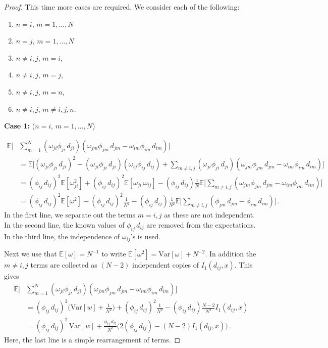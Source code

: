 \documentclass{article}
\newcommand{\EE}{\mathds{E}}
\newcommand{\var}{\text{Var}}
\begin{document}
\begin{proof}
    This time more cases are required. We consider each of the following:
    \begin{enumerate}
        \item $n=i$, $m=1,\dots,N$
        \item $n=j$, $m=1,\dots,N$
        \item $n\neq i,j$, $m=i$, 
        \item $n\neq i,j$, $m=j$, 
        \item $n\neq i,j$, $m=n$, 
        \item $n\neq i,j$, $m\neq i,j,n$. 
    \end{enumerate}
    
    \textbf{Case 1:} ($n=i$, $m=1,\dots,N$)
    
    \begin{align*}
        \EE\Bigg[&\sum_{m=1}^N (\omega_{ji}\phi_{ji} \, d_{ji} )(\omega_{jm}\phi_{jm} \, d_{jm} - \omega_{im}\phi_{im} \, d_{im}) \Bigg] \\
        &= \EE\Bigg[(\omega_{ji}\phi_{ji} \, d_{ji} )^2 
        - (\omega_{ji}\phi_{ji} \, d_{ji} )(\omega_{ij}\phi_{ij} \, d_{ij}) 
        + \sum_{m\neq i,j} (\omega_{ji}\phi_{ji} \, d_{ji} )(\omega_{jm}\phi_{jm} \, d_{jm} - \omega_{im}\phi_{im} \, d_{im}) \Bigg] \\
        &= (\phi_{ij} \, d_{ij} )^2\EE[\omega_{ji}^2 ] 
        + (\phi_{ij} \, d_{ij} )^2 \EE[\omega_{ji} \, \omega_{ij} ]
        - (\phi_{ij} \, d_{ij}) \frac{1}{N} \EE\Bigg[\sum_{m\neq i,j} (\omega_{jm}\phi_{jm} \, d_{jm} - \omega_{im}\phi_{im} \, d_{im}) \Bigg] \\
        &= (\phi_{ij} \, d_{ij} )^2\EE[\omega^2 ] 
        + (\phi_{ij} \, d_{ij} )^2 \frac{1}{N^2}
        - (\phi_{ij} \, d_{ij}) \frac{1}{N^2} \EE\Bigg[\sum_{m\neq i,j} (\phi_{jm} \, d_{jm} - \phi_{im} \, d_{im}) \Bigg]  \,.
    \end{align*}
    In the first line, we separate out the terms $m=i,j$ as these are not independent. In the second line, the known values of $\phi_{ij}\,d_{ij}$ are removed from the expectations. In the third line, the independence of $\omega_{ij}$'s is used. 

    Next we use that $\EE[\omega]=N^{-1}$ to write $\EE[\omega^2]=\var[\omega] + N^{-2}$. In addition the $m\neq i,j$ terms are collected as $(N-2)$ independent copies of $I_1(d_{ij},x)$. This gives
    \begin{align*}
        \EE\Bigg[&\sum_{m=1}^N (\omega_{ji}\phi_{ji} \, d_{ji} )(\omega_{jm}\phi_{jm} \, d_{jm} - \omega_{im}\phi_{im} \, d_{im}) \Bigg] \\
        &= (\phi_{ij} \, d_{ij} )^2 \bigg( \var[w] + \frac{1}{N^2} \bigg) 
        + (\phi_{ij} \, d_{ij} )^2 \frac{1}{N^2}
        - (\phi_{ij} \, d_{ij}) \frac{N-2}{N^2} I_1(d_{ij},x) \\
        &= (\phi_{ij} \, d_{ij} )^2 \, \var[w]  
        + \frac{\phi_{ij} \, d_{ij}}{N^2} \Bigg( 2(\phi_{ij} \, d_{ij} )
        - (N-2) I_1(d_{ij},x) \Bigg) \,.
    \end{align*}
    Here, the last line is a simple rearrangement of terms. 
    

\end{proof}
\end{document}

